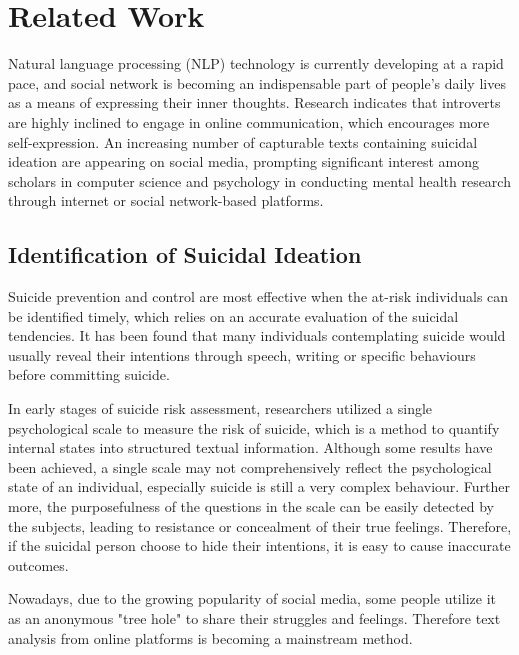 \documentclass[ %
                    author={Bocheng Wang},
                supervisor={Dr. Qiang Liu},
                    degree={MSc},
                     title={A Research on Identification of Suicide Ideation in Texts with Multiple Models},
                      type={},
                      year={2024}]{dissertation}
\begin{document}

\chapter{Related Work}
\label{chap:background}
\noindent
Natural language processing (NLP) technology is currently developing at a rapid pace, and social network is becoming an indispensable part of people's daily lives as a means of expressing their inner thoughts. Research indicates that introverts are highly inclined to engage in online communication, which encourages more self-expression. An increasing number of capturable texts containing suicidal ideation are appearing on social media, prompting significant interest among scholars in computer science and psychology in conducting mental health research through internet or social network-based platforms.

\section{Identification of Suicidal Ideation}
\noindent
Suicide prevention and control are most effective when the at-risk individuals can be identified timely, which relies on an accurate evaluation of the suicidal tendencies. It has been found that many individuals contemplating suicide would usually reveal their intentions through speech, writing or specific behaviours before committing suicide\cite{smith2008revisiting}.

In early stages of suicide risk assessment, researchers utilized a single psychological scale to measure the risk of suicide, which is a method to quantify internal states into structured textual information\cite{Ghorashi2012AFP}. Although some results have been achieved\cite{sebastiani2006sentiwordnet}, a single scale may not comprehensively reflect the psychological state of an individual, especially suicide is still a very complex behaviour. Further more, the purposefulness of the questions in the scale can be easily detected by the subjects, leading to resistance or concealment of their true feelings\cite{world2014preventing}. Therefore, if the suicidal person choose to hide their intentions, it is easy to cause inaccurate outcomes.

Nowadays, due to the growing popularity of social media, some people utilize it as an anonymous "tree hole" to share their struggles and feelings. Therefore text analysis\cite{fursich2009defense} from online platforms is becoming a mainstream method.
\end{document}
